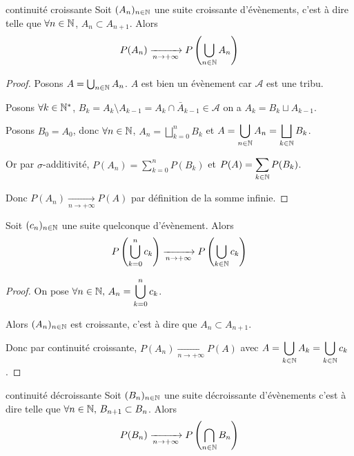 \begin{theoreme}{continuité croissante}{}
    Soit $(A_n)_{n \in \mathbb{N}}$ une suite croissante d'évènements, c'est à dire telle que $\forall n \in \mathbb{N}$, 
    $A_n \subset A_{n+1}$. Alors $$P(A_n) \xrightarrow[n \to + \infty]{} P\left( \bigcup_{n \in \mathbb{N}} A_n \right)$$
\end{theoreme}


\begin{proof}
    Posons $A = \bigcup_{n \in \mathbb{N}} A_n$. $A$ est bien un évènement car $\mathcal A$ est une tribu.

    Posons $\forall k \in \mathbb{N}^*$, $B_k = A_k \setminus A_{k-1} = A_k \cap \bar A_{k-1} \in \mathcal A$
    on a $A_k = B_k \sqcup A_{k - 1}$. 

    Posons $B_0 = A_0$, donc $\forall n \in \mathbb{N}$, $\displaystyle A_n = \bigsqcup_{k = 0}^n B_k$ 
    et $A = \displaystyle \bigcup_{n \in \mathbb{N}} A_n = \bigsqcup_{k \in \mathbb{N}} B_k$.

    Or par $\sigma$-additivité, $\displaystyle P(A_n) = \sum_{k = 0}^n P(B_k)$ et 
    $\displaystyle P(A) = \sum_{k \in \mathbb{N}} P(B_k)$.

    Donc $P(A_n) \xrightarrow[n \to + \infty]{} P(A)$ par définition de la somme infinie.
\end{proof}

\begin{proposition}{}{}
    Soit $(c_n)_{n \in \mathbb{N}}$ une suite quelconque d'évènement. Alors 
    $$P\left( \bigcup_{k = 0}^n c_k \right) \xrightarrow[n \to + \infty]{} P\left( \bigcup_{k \in \mathbb{N}} c_k \right)$$
\end{proposition}


\begin{proof}
    On pose $\forall n \in \mathbb{N}, \, \displaystyle A_n = \bigcup_{k = 0}^n c_k$. 

    Alors $(A_n)_{n \in \mathbb{N}}$ est croissante, c'est à dire que $A_n \subset A_{n + 1}$. 

    Donc par continuité croissante, $P(A_n) \xrightarrow[n \to + \infty]{} P(A)$
    avec $\displaystyle A = \bigcup_{k \in \mathbb{N}} A_k = \bigcup_{k \in \mathbb{N}} c_k$.
\end{proof}

\begin{theoreme}{continuité décroissante}{}
    Soit $(B_n)_{n \in \mathbb{N}}$ une suite décroissante d'évènements c'est à dire telle que $\forall n \in \mathbb{N}, \, B_{n + 1} \subset B_n$.
    Alors $$\displaystyle P(B_n) \xrightarrow[n \to + \infty]{} P\left( \bigcap_{n \in \mathbb{N}} B_n \right)$$
\end{theoreme}

